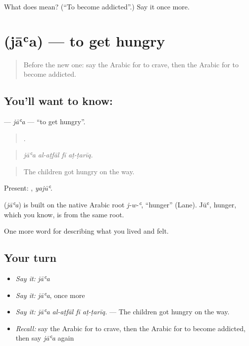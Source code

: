 \begin{tcolorbox}[breakable,colback=teal!4,colframe=teal!35!black,title={Before you move on}]
What does  mean? (\textquotedblleft{}To become addicted\textquotedblright{}.) Say it once more.
\end{tcolorbox}
\section[\texorpdfstring{\ar{جاع} (jāʿa)}{جاع (jāʿa)}]{ (jāʿa) — to get hungry}

\label{lesson:AR-C517-jaa}



\begin{quote}
Before the new one: say the Arabic for to crave, then the Arabic for to become addicted.
\end{quote}

\subsection*{You'll want to know: }
\textbf{} — \emph{jāʿa} — \textquotedblleft{}to get hungry\textquotedblright{}.

\begin{quote}
   .
\end{quote}

\begin{quote}
\emph{jāʿa al-aṭfāl fī aṭ-ṭarīq.}
\end{quote}

\begin{quote}
The children got hungry on the way.
\end{quote}

Present: , \emph{yajūʿ}.

\begin{cousinweb}
\textbf{} (\emph{jāʿa}) is built on the native Arabic root \emph{j-w-ʿ}, \textquotedblleft{}hunger\textquotedblright{} (Lane). Jūʿ, hunger, which you know, is from the same root.
\end{cousinweb}

\begin{grammarlens}[title={What you've built}]
One more word for describing what you lived and felt.
\end{grammarlens}

\subsection*{Your turn}
\begin{itemize}
\raggedright
  \item \emph{Say it:} \emph{jāʿa}
  \item \emph{Say it:} \emph{jāʿa}, once more
  \item \emph{Say it:} \emph{jāʿa al-aṭfāl fī aṭ-ṭarīq.} — The children got hungry on the way.
  \item \emph{Recall:} say the Arabic for to crave, then the Arabic for to become addicted, then say \emph{jāʿa} again
\end{itemize}

